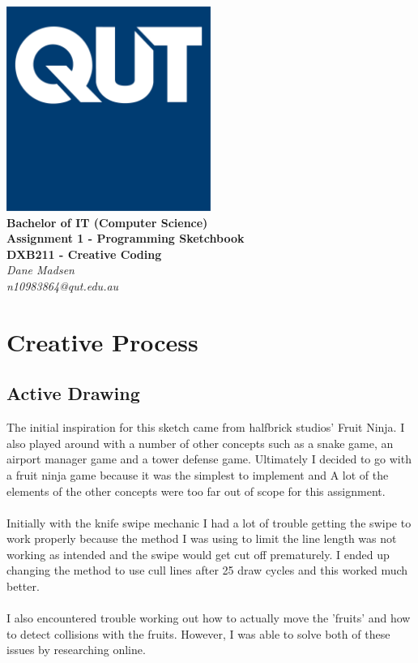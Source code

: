\documentclass[12pt,a4paper]{article}
\begin{document}
	\begin{titlepage}
		\begin{center}
			\includegraphics[width=0.5\textwidth]{QUT.jpg}\\
			[0.03\textheight]  
			\Large\textbf{Bachelor of IT (Computer Science)}\\
			\Large\textbf{Assignment 1 - Programming Sketchbook}\\
			\large\textbf{DXB211 - Creative Coding}\\
			[0.02\textheight]
			\large\textsl{Dane Madsen}\\
			\large\textsl{n10983864@qut.edu.au}
		\end{center}
		
	\end{titlepage}

	\section{Creative Process}
		\subsection{Active Drawing}
			The initial inspiration for this sketch came from halfbrick studios' Fruit Ninja.
			I also played around with a number of other concepts such as a snake game, an airport 
			manager game and a tower defense game. Ultimately I decided to go with a fruit ninja 
			game because it was the simplest to implement and A lot of the elements of the other 
			concepts were too far out of scope for this assignment.\\\\Initially with the knife 
			swipe mechanic I had a lot of trouble getting the swipe to work properly because the 
			method I was using to limit the line length was not working as intended and the swipe 
			would get cut off prematurely. I ended up changing the method to use cull lines after 
			25 draw cycles and this worked much better.\\\\I also encountered trouble working out 
			how to actually move the 'fruits' and how to detect collisions with the fruits. However, 
			I was able to solve both of these issues by researching online.
		
\end{document}
